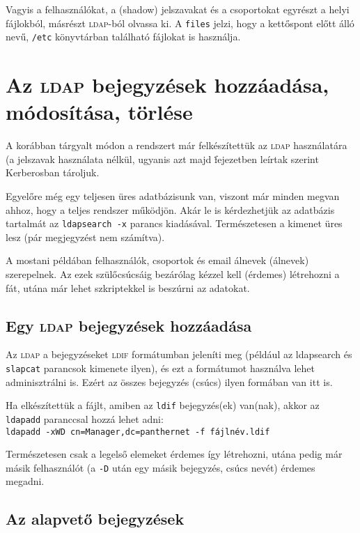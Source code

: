 Vagyis a felhasználókat, a  (shadow) jelszavakat és a csoportokat egyrészt a helyi fájlokból, másrészt \textsc{ldap}-ból
olvassa ki. A \texttt{files} jelzi, hogy a kettőspont előtt álló nevű, \texttt{/etc} könyvtárban található fájlokat is
használja.



\section{Az \textsc{ldap} bejegyzések hozzáadása, módosítása,  törlése}\label{sec:ldap-add-modify}
A korábban tárgyalt módon a rendszert már felkészítettük az \textsc{ldap} használatára (a jelszavak használata nélkül,
ugyanis azt majd \. fejezetben leírtak szerint Kerberosban tároljuk.


Egyelőre még egy teljesen üres adatbázisunk van, viszont már minden megvan ahhoz, hogy a teljes rendszer működjön. Akár
le is kérdezhetjük az adatbázis tartalmát az \texttt{ldapsearch -x} parancs kiadásával. Természetesen a kimenet üres
lesz (pár megjegyzést nem számítva).

A mostani példában felhasználók, csoportok és email álnevek (álnevek) szerepelnek. Az ezek szülőcsúcsáig bezárólag
kézzel kell (érdemes) létrehozni a fát, utána már lehet szkriptekkel is beszúrni az adatokat.



\subsection{Egy \textsc{ldap} bejegyzések hozzáadása}

Az \textsc{ldap} a bejegyzéseket \textsc{ldif} formátumban jeleníti meg (például az ldapsearch és \texttt{slapcat}
parancsok kimenete ilyen), és  ezt a formátumot használva lehet adminisztrálni is. Ezért az összes bejegyzés (csúcs)
ilyen formában van itt is.

Ha elkészítettük a fájlt, amiben az \texttt{ldif} bejegyzés(ek) van(nak), akkor az \texttt{ldapadd} paranccsal hozzá
lehet adni:\\
\texttt{ldapadd -xWD cn=Manager,dc=panthernet -f fájlnév.ldif}

Természetesen csak a legelső elemeket érdemes így létrehozni, utána pedig már másik felhasználót (a \texttt{-D} után egy
másik bejegyzés, csúcs nevét) érdemes megadni.


\subsection{Az alapvető bejegyzések}

